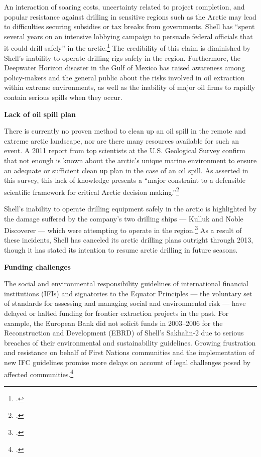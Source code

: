 An interaction of soaring costs, uncertainty related to project completion, and popular resistance against drilling in sensitive regions such as the Arctic may lead to difficulties securing subsidies or tax breaks from governments.
Shell has ``spent several years on an intensive lobbying campaign to persuade federal officials that it could drill safely'' in the arctic.\footcite{ShellSuspends}
The credibility of this claim is diminished by Shell's inability to operate drilling rigs safely in the region.
Furthermore, the Deepwater Horizon disaster in the Gulf of Mexico has raised awareness among policy-makers and the general public about the risks involved in oil extraction within extreme environments, as well as the inability of major oil firms to rapidly contain serious spills when they occur.



\textbf{Lack of oil spill plan}



There is currently no proven method to clean up an oil spill in the remote and extreme arctic landscape, nor are there many resources available for such an event. 
A 2011 report from top scientists at the U.S. Geological Survey confirm that not enough is known about the arctic's unique marine environment to ensure an adequate or sufficient clean up plan in the case of an oil spill. 
As asserted in this survey, this lack of knowledge presents a ``major constraint to a defensible scientific framework for critical Arctic decision making.''\footcite[][]{Holland-BartelsPierce_2011}



Shell's inability to operate drilling equipment safely in the arctic is highlighted by the damage suffered by the company's two drilling ships --- Kulluk and Noble Discoverer --- which were attempting to operate in the region.\footcite{ShellSuspends}
As a result of these incidents, Shell has canceled its arctic drilling plans outright through 2013, though it has stated its intention to resume arctic drilling in future seasons.



\textbf{Funding challenges}



The social and environmental responsibility guidelines of international financial institutions (IFIs) and signatories to the Equator Principles --- the voluntary set of standards for assessing and managing social and environmental risk --- have delayed or halted funding for frontier extraction projects in the past. 
For example, the European Bank did not solicit funds in 2003--2006 for the Reconstruction and Development (EBRD) of Shell's Sakhalin-2 due to serious breaches of their environmental and sustainability guidelines. 
Growing frustration and resistance on behalf of First Nations communities and the implementation of new IFC guidelines promise more delays on account of legal challenges posed by affected communities.\footcite[][]{Mathiason_2005}



